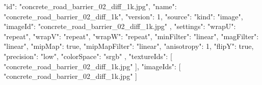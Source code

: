 {
  "id": "concrete_road_barrier_02_diff_1k.jpg",
  "name": "concrete_road_barrier_02_diff_1k",
  "version": 1,
  "source": {
    "kind": "image",
    "imageId": "concrete_road_barrier_02_diff_1k.jpg"
  },
  "settings": {
    "wrapU": "repeat",
    "wrapV": "repeat",
    "wrapW": "repeat",
    "minFilter": "linear",
    "magFilter": "linear",
    "mipMap": true,
    "mipMapFilter": "linear",
    "anisotropy": 1,
    "flipY": true,
    "precision": "low",
    "colorSpace": "srgb"
  },
  "textureIds": [
    "concrete_road_barrier_02_diff_1k.jpg"
  ],
  "imageIds": [
    "concrete_road_barrier_02_diff_1k.jpg"
  ]
}
